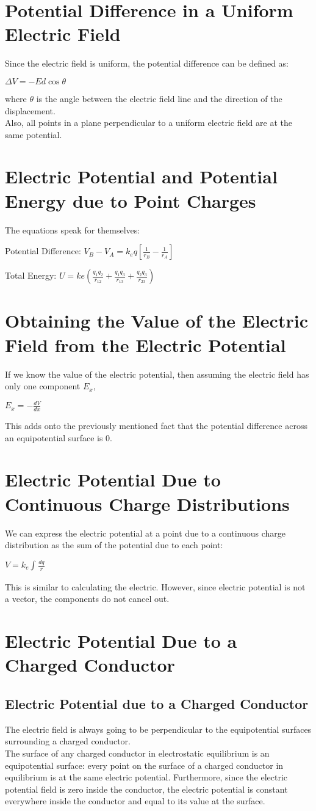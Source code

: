 \documentclass[12pt]{report}
\begin{document}
	\section{Potential Difference in a Uniform Electric Field}
		Since the electric field is uniform, the potential difference can be defined as:\\
		\centerline{$\Delta V = -Ed\cos \theta$}
		where $\theta$ is the angle between the electric field line and the direction of the displacement.\\
		Also, all points in a plane perpendicular to a uniform electric field are at the same potential.
	\section{Electric Potential and Potential Energy due to Point Charges}
		The equations speak for themselves:\\
		\centerline{Potential Difference: $V_B - V_A = k_e q[\frac{1}{r_B} - \frac{1}{r_A}]$}
		\centerline{Total Energy: $U = ke(\frac{q_1q_2}{r_{12}} + \frac{q_1q_3}{r_{13}} + \frac{q_2q_3}{r_{23}})$}
	\section{Obtaining the Value of the Electric Field from the Electric Potential}
		If we know the value of the electric potential, then assuming the electric field has only one component $E_x$, \\
		\centerline{$E_x = -\frac{dV}{dx}$}
		This adds onto the previously mentioned fact that the potential difference across an equipotential surface is 0.
	\section{Electric Potential Due to Continuous Charge Distributions}
		We can express the electric potential at a point due to a continuous charge distribution as the sum of the potential due to each point:\\
		\centerline{$V = k_e \int_{}^{} \frac{dq}{r}$}
		This is similar to calculating the electric. However, since electric potential is not a vector, the components do not cancel out.
	\section{Electric Potential Due to a Charged Conductor}
		\subsection{Electric Potential due to a Charged Conductor}
			The electric field is always going to be perpendicular to the equipotential surfaces surrounding a charged conductor.\\
			The surface of any charged conductor in electrostatic equilibrium is an equipotential surface: every point on the surface of a charged conductor in equilibrium is at the same electric potential. Furthermore, since the electric potential field is zero inside the conductor, the electric potential is constant everywhere inside the conductor and equal to its value at the surface.
\end{document}
